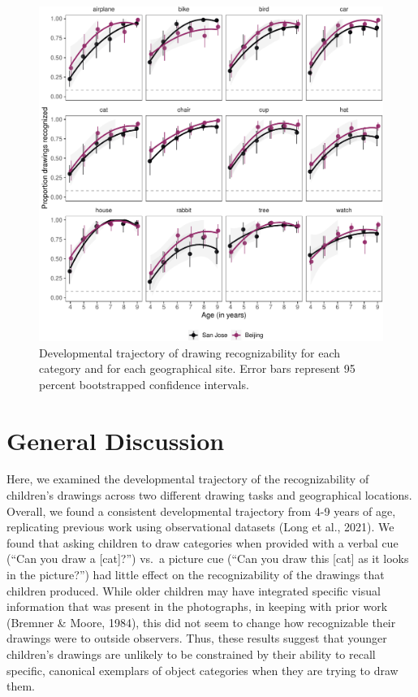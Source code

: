 \documentclass[
  english,
  man]{apa6}
\begin{document}
\begin{figure}[H]

{\centering \includegraphics[width=\textwidth]{figs/item-effects-1} 

}

\caption{Developmental trajectory of drawing recognizability for each category and for each geographical site. Error bars represent 95 percent bootstrapped confidence intervals.}\label{fig:item-effects}
\end{figure}

\hypertarget{general-discussion}{%
\section{General Discussion}\label{general-discussion}}

Here, we examined the developmental trajectory of the recognizability of children's drawings across two different drawing tasks and geographical locations. Overall, we found a consistent developmental trajectory from 4-9 years of age, replicating previous work using observational datasets (Long et al., 2021). We found that asking children to draw categories when provided with a verbal cue (\enquote{Can you draw a {[}cat{]}?}) vs.~a picture cue (\enquote{Can you draw this {[}cat{]} as it looks in the picture?}) had little effect on the recognizability of the drawings that children produced. While older children may have integrated specific visual information that was present in the photographs, in keeping with prior work (Bremner \& Moore, 1984), this did not seem to change how recognizable their drawings were to outside observers. Thus, these results suggest that younger children's drawings are unlikely to be constrained by their ability to recall specific, canonical exemplars of object categories when they are trying to draw them.
\end{document}
